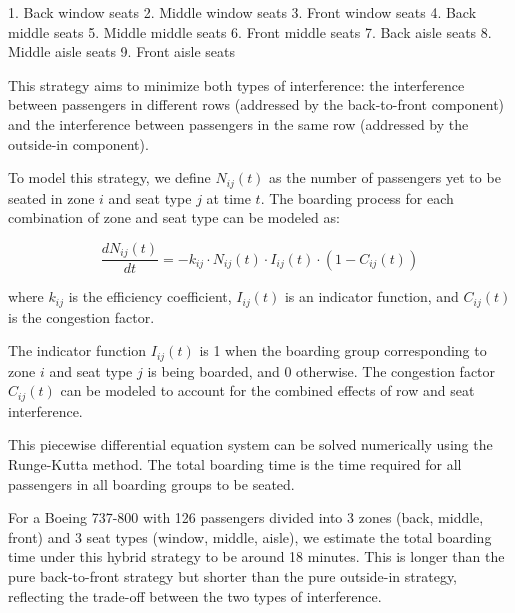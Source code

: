 \documentclass[12pt,a4paper]{article}
\begin{document}
1. Back window seats
2. Middle window seats
3. Front window seats
4. Back middle seats
5. Middle middle seats
6. Front middle seats
7. Back aisle seats
8. Middle aisle seats
9. Front aisle seats

This strategy aims to minimize both types of interference: the interference between passengers in different rows (addressed by the back-to-front component) and the interference between passengers in the same row (addressed by the outside-in component).

To model this strategy, we define $N_{ij}(t)$ as the number of passengers yet to be seated in zone $i$ and seat type $j$ at time $t$. The boarding process for each combination of zone and seat type can be modeled as:

\begin{equation}
\frac{dN_{ij}(t)}{dt} = -k_{ij} \cdot N_{ij}(t) \cdot I_{ij}(t) \cdot (1 - C_{ij}(t))
\label{eq:hybrid_boarding}
\end{equation}

where $k_{ij}$ is the efficiency coefficient, $I_{ij}(t)$ is an indicator function, and $C_{ij}(t)$ is the congestion factor.

The indicator function $I_{ij}(t)$ is 1 when the boarding group corresponding to zone $i$ and seat type $j$ is being boarded, and 0 otherwise. The congestion factor $C_{ij}(t)$ can be modeled to account for the combined effects of row and seat interference.

This piecewise differential equation system can be solved numerically using the Runge-Kutta method. The total boarding time is the time required for all passengers in all boarding groups to be seated.

For a Boeing 737-800 with 126 passengers divided into 3 zones (back, middle, front) and 3 seat types (window, middle, aisle), we estimate the total boarding time under this hybrid strategy to be around 18 minutes. This is longer than the pure back-to-front strategy but shorter than the pure outside-in strategy, reflecting the trade-off between the two types of interference.
\end{document}
